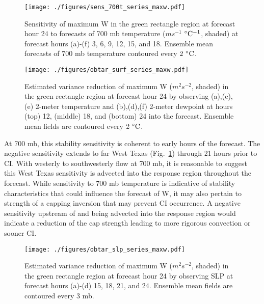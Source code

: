 \documentclass{ttuthes2007}
\newcommand{\tab}{\hspace*{2em}}  %
\begin{document}
\begin{figure}[!tb]
  \centering
  \noindent\texttt{[image: ./figures/sens\_700t\_series\_maxw.pdf]}\\
  \caption{Sensitivity of maximum W in the green rectangle region at forecast hour 24 to forecasts of 700 mb temperature ($m s^{-1}$ ${}^{\circ} {\rm C^{-1}}$, shaded) at forecast hours (a)-(f) 3, 6, 9, 12, 15, and 18. Ensemble mean forecasts of 700 mb temperature contoured every $2^{~\circ} {\rm C}$. }
\label{sens_700t_series_maxw}
\end{figure}

\begin{figure}[!tb]
  \centering
  \noindent\texttt{[image: ./figures/obtar\_surf\_series\_maxw.pdf]}\\
  \caption{Estimated variance reduction of maximum W ($m^2 s^{-2}$, shaded) in the green rectangle region at forecast hour 24 by observing (a),(c),(e) 2-meter temperature and (b),(d),(f) 2-meter dewpoint at hours (top) 12, (middle) 18, and (bottom) 24 into the forecast. Ensemble mean fields are contoured every $2^{~\circ} {\rm C}$.}
\label{obtar_surf_series_maxw}
\end{figure}

\tab At 700 mb, this stability sensitivity is coherent to early hours of the forecast. The negative sensitivity extends to far West Texas (Fig.~\ref{sens_700t_series_maxw}) through 21 hours prior to CI. With westerly to southwesterly flow at 700 mb, it is reasonable to suggest this West Texas sensitivity is advected into the response region throughout the forecast. While sensitivity to 700 mb temperature is indicative of stability characteristics that could influence the forecast of W, it may also pertain to strength of a capping inversion that may prevent CI occurrence. A negative sensitivity upstream of and being advected into the response region would indicate a reduction of the cap strength leading to more rigorous convection or sooner CI. 


\begin{figure}[!tb]
  \centering
  \noindent\texttt{[image: ./figures/obtar\_slp\_series\_maxw.pdf]}\\
  \caption{Estimated variance reduction of maximum W ($m^2 s^{-2}$, shaded) in the green rectangle region at forecast hour 24 by observing SLP at forecast hours (a)-(d) 15, 18, 21, and 24. Ensemble mean fields are contoured every 3 mb.}
\label{obtar_slp_series_maxw}
\end{figure}
\end{document}
